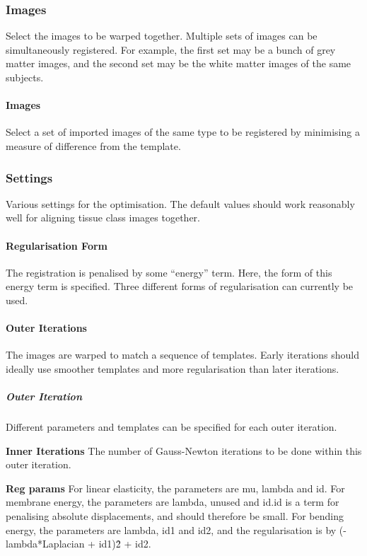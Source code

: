 \subsubsection{Images}
Select the images to be warped together. Multiple sets of images can be simultaneously registered. For example, the first set may be a bunch of grey matter images, and the second set may be the white matter images of the same subjects.


\paragraph{Images}
Select a set of imported images of the same type to be registered by minimising a measure of difference from the template.


\subsubsection{Settings}
Various settings for the optimisation. The default values should work reasonably well for aligning tissue class images together.


\paragraph{Regularisation Form}
The registration is penalised by some ``energy'' term.  Here, the form of this energy term is specified. Three different forms of regularisation can currently be used.


\paragraph{Outer Iterations}
The images are warped to match a sequence of templates. Early iterations should ideally use smoother templates and more regularisation than later iterations.


\subparagraph{Outer Iteration}
Different parameters and templates can be specified for each outer iteration.


\textbf{Inner Iterations}
The number of Gauss-Newton iterations to be done within this outer iteration.


\textbf{Reg params}
For linear elasticity, the parameters are mu, lambda and id. For membrane energy, the parameters are lambda, unused and id.id is a term for penalising absolute displacements, and should therefore be small.  For bending energy, the parameters are lambda, id1 and id2, and the regularisation is by (-lambda*Laplacian + id1)\^2 + id2.

